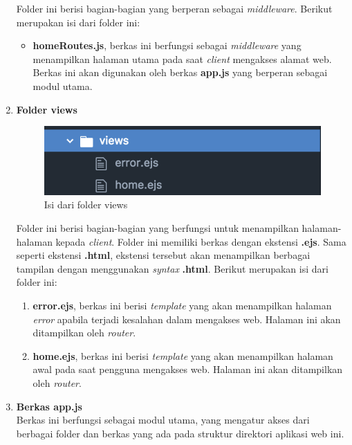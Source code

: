 \begin{enumerate}
	Folder ini berisi bagian-bagian yang berperan sebagai \textit{middleware}. Berikut merupakan isi dari folder ini:
	\begin{itemize}
		\item \textbf{homeRoutes.js}, berkas ini berfungsi sebagai \textit{middleware} yang menampilkan halaman utama pada saat \textit{client} mengakses alamat web. Berkas ini akan digunakan oleh berkas \textbf{app.js} yang berperan sebagai modul utama.
	\end{itemize}

	\item \textbf{Folder views} \\
	
	\begin{figure}[H]
		\centering
		\includegraphics[scale=0.4]{Gambar/direktori_views}
		\caption{Isi dari folder views}
		\label{fig:direktori_views}
	\end{figure}
	
	Folder ini berisi bagian-bagian yang berfungsi untuk menampilkan halaman-halaman kepada \textit{client}. Folder ini memiliki berkas dengan ekstensi \textbf{.ejs}. Sama seperti ekstensi \textbf{.html}, ekstensi tersebut akan menampilkan berbagai tampilan dengan menggunakan \textit{syntax} \textbf{.html}. Berikut merupakan isi dari folder ini:
	
	\begin{enumerate}
		\item \textbf{error.ejs}, berkas ini berisi \textit{template} yang akan menampilkan halaman \textit{error} apabila terjadi kesalahan dalam mengakses web. Halaman ini akan ditampilkan oleh \textit{router}.
		
		\item \textbf{home.ejs}, berkas ini berisi \textit{template} yang akan menampilkan halaman awal pada saat pengguna mengakses web. Halaman ini akan ditampilkan oleh \textit{router}.
	\end{enumerate}
	
	
	\item \textbf{Berkas app.js} \\ 
	Berkas ini berfungsi sebagai modul utama, yang mengatur akses dari berbagai folder dan berkas yang ada pada struktur direktori aplikasi web ini.
	

\end{enumerate}
